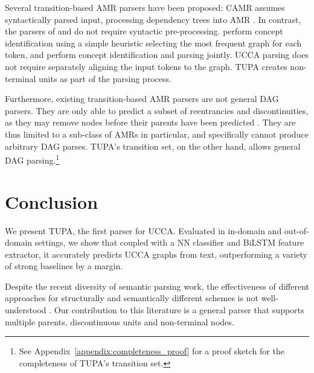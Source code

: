 \documentclass[11pt,a4paper]{article}
\newcommand{\parser}[1]{TUPA\textsubscript{#1}}
\begin{document}
Several transition-based AMR parsers have been proposed:
CAMR assumes syntactically parsed input,
processing dependency trees into AMR
\cite{wang-xue-pradhan:2015:ACL-IJCNLP,wang2015transition,wang-EtAl:2016:SemEval,goodman2016noise}.
In contrast, the parsers of \citet{damonte-17} and \citet{zhou2016amr}
do not require syntactic pre-processing.
\citet{damonte-17} perform concept identification using
a simple heuristic selecting the most frequent graph for each token, and
\citet{zhou2016amr} perform concept identification and parsing jointly.
UCCA parsing does not require separately aligning the input tokens to the graph.
\parser{} creates non-terminal units as part of the parsing process.

Furthermore, existing transition-based AMR parsers are not general DAG parsers.
They are only able to predict a subset of reentrancies and discontinuities,
as they may remove nodes before their parents have been predicted
\cite{damonte-17}.
They are thus limited to a sub-class of AMRs in particular,
and specifically cannot produce arbitrary DAG parses.
\parser{}'s transition set, on the other hand, allows general DAG
parsing.\footnote{See Appendix~\ref{appendix:completeness_proof} for a proof sketch for the
completeness of \parser{}'s transition set.}



\section{Conclusion}\label{sec:conclusion}

We present \parser{}, the first parser for UCCA.
Evaluated in in-domain and out-of-domain settings, we show that coupled with a
NN classifier and BiLSTM feature extractor,
it accurately predicts UCCA graphs from text, outperforming a variety of
strong baselines by a margin.

Despite the recent diversity of semantic parsing work,
the effectiveness of different approaches for
structurally and semantically different schemes is not well-understood
\cite{kuhlmann2016towards}.
Our contribution to this literature is a general parser
that supports multiple parents, discontinuous units and non-terminal nodes.
\end{document}
